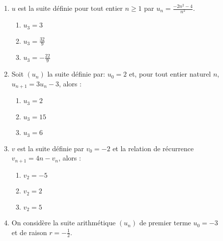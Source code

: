 \documentclass[oneside,twocolumn,landscape]{book}
\begin{document}
\begin{enumerate}
\begin{enumerate}
\end{enumerate}






\item $u$ est la suite définie pour tout entier $n \geqslant 1$ par $u_{n}=\frac{-2n^{2}-4}{n^{2}}$.

\begin{enumerate}

\item\MauvaiseReponse $u_{3}=3$


\item\MauvaiseReponse $u_{3} =\frac{32}{9}$
\item\BonneReponse $u_{3}=-\frac{22}{9}$

\end{enumerate}



\item Soit $\left(u_{n}\right)$ la suite définie par: $u_{0}=2$ et, pour tout entier naturel $n$, $u_{n+1}=3 u_{n}-3$, alors :

\begin{enumerate}

\item\MauvaiseReponse $u_{3}=2$

\item\BonneReponse $u_{3}=15$
\item\MauvaiseReponse $u_{3}=6$


\end{enumerate}



\newpage

\item $v$ est la suite définie par $v_{0}=-2$ et la relation de récurrence\\ $v_{n+1}=4n-v_{n}$, alors :

\begin{enumerate}


\item\MauvaiseReponse $v_{2}=-5$
\item\BonneReponse $v_{2}=2$

\item\MauvaiseReponse $v_{2}=5$

\end{enumerate}



\item On considère la suite arithmétique $\left(u_{n}\right)$ de premier terme $u_{0}=-3$\\ et de raison $r=-\frac{1}{2}$.


\end{enumerate}
\end{document}
